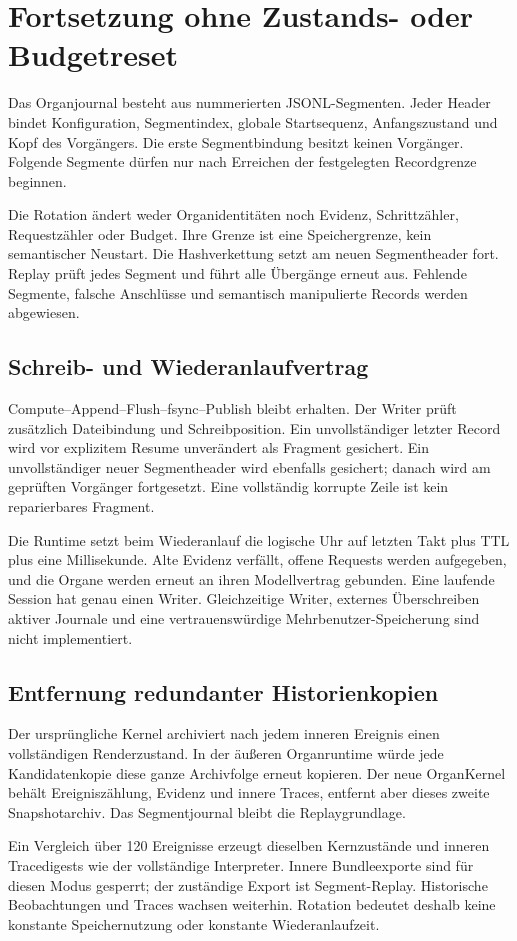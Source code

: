 \documentclass[11pt,a4paper]{article}
\newcommand{\nextsection}[2]{\clearpage{\color{accent}\small\textsf{#1}}\section{#2}}
\begin{document}
\nextsection{25 / SEGMENTIERTE LINEAGE}{Fortsetzung ohne Zustands- oder Budgetreset}
Das Organjournal besteht aus nummerierten JSONL-Segmenten.
Jeder Header bindet Konfiguration, Segmentindex,
globale Startsequenz, Anfangszustand und Kopf des Vorgängers.
Die erste Segmentbindung besitzt keinen Vorgänger.
Folgende Segmente dürfen nur nach Erreichen der festgelegten
Recordgrenze beginnen.

Die Rotation ändert weder Organidentitäten noch Evidenz,
Schrittzähler, Requestzähler oder Budget. Ihre Grenze ist eine
Speichergrenze, kein semantischer Neustart.
Die Hashverkettung setzt am neuen Segmentheader fort.
Replay prüft jedes Segment und führt alle Übergänge erneut aus.
Fehlende Segmente, falsche Anschlüsse und semantisch
manipulierte Records werden abgewiesen.

\subsection{Schreib- und Wiederanlaufvertrag}
Compute--Append--Flush--fsync--Publish bleibt erhalten.
Der Writer prüft zusätzlich Dateibindung und Schreibposition.
Ein unvollständiger letzter Record wird vor explizitem Resume
unverändert als Fragment gesichert. Ein unvollständiger neuer
Segmentheader wird ebenfalls gesichert; danach wird am
geprüften Vorgänger fortgesetzt. Eine vollständig korrupte
Zeile ist kein reparierbares Fragment.

Die Runtime setzt beim Wiederanlauf die logische Uhr auf
letzten Takt plus TTL plus eine Millisekunde. Alte Evidenz
verfällt, offene Requests werden aufgegeben, und die Organe
werden erneut an ihren Modellvertrag gebunden.
Eine laufende Session hat genau einen Writer. Gleichzeitige
Writer, externes Überschreiben aktiver Journale und eine
vertrauenswürdige Mehrbenutzer-Speicherung sind nicht implementiert.

\subsection{Entfernung redundanter Historienkopien}
Der ursprüngliche Kernel archiviert nach jedem inneren Ereignis
einen vollständigen Renderzustand. In der äußeren Organruntime
würde jede Kandidatenkopie diese ganze Archivfolge erneut
kopieren. Der neue OrganKernel behält Ereigniszählung,
Evidenz und innere Traces, entfernt aber dieses zweite
Snapshotarchiv. Das Segmentjournal bleibt die Replaygrundlage.

Ein Vergleich über 120 Ereignisse erzeugt dieselben
Kernzustände und inneren Tracedigests wie der vollständige
Interpreter. Innere Bundleexporte sind für diesen Modus
gesperrt; der zuständige Export ist Segment-Replay.
Historische Beobachtungen und Traces wachsen weiterhin.
Rotation bedeutet deshalb keine konstante Speichernutzung
oder konstante Wiederanlaufzeit.
\end{document}
